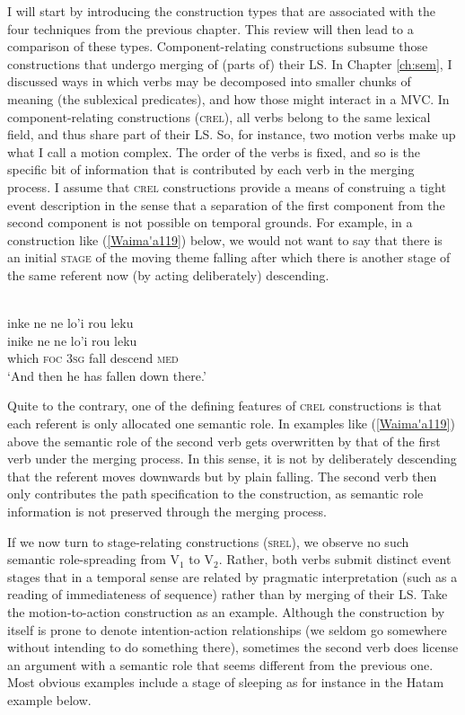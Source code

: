 I will start by introducing the construction types that are associated with the four techniques from the previous chapter. This review will then lead to a comparison of these types. Component-relating constructions subsume those constructions that undergo merging of (parts of) their LS. In Chapter \ref{ch:sem}, I  discussed ways in which verbs may be decomposed into smaller chunks of meaning (the sublexical predicates), and how those might interact in a MVC. In component-relating constructions (\textsc{crel}), all verbs belong to the same lexical field, and thus share part of their LS. So, for instance, two motion verbs make up what I call a motion complex. The order of the verbs is fixed, and so is the specific bit of information that is contributed by each verb in the merging process. I assume that \textsc{crel} constructions provide a means of construing a tight event description in the sense that a separation of the first component from the second component is not possible on temporal grounds. For example, in a construction like (\ref{Waima'a119}) below, we would not want to say that there is an initial \textsc{stage} of the moving theme falling after which there is another stage of the same referent now (by acting deliberately) descending. 

\ea \label{Waima'a119}
\\
\glll inke ne ne lo'i rou leku \\
inike ne ne lo'i rou leku \\
which \textsc{foc} \textsc{3}\textsc{sg} fall descend \textsc{med} \\
\glft `And then he has fallen down there.' \\ 
\z

Quite to the contrary, one of the defining features of \textsc{crel} constructions is that each referent is only allocated one semantic role. In examples like (\ref{Waima'a119}) above the semantic role of the second verb gets overwritten by that of the first verb under the merging process. In this sense, it is not by deliberately descending that the referent moves downwards but by plain falling. The second verb then only contributes the path specification to the construction, as semantic role information is not preserved through the merging process.
 
If we now turn to stage-relating constructions (\textsc{srel}), we observe no such semantic role-spreading from V$_1$ to V$_2$. Rather, both verbs submit distinct event stages that in a temporal sense are related by pragmatic interpretation (such as a reading of immediateness of sequence) rather than by merging of their LS. Take the motion-to-action construction as an example. Although the construction by itself is prone to denote intention-action relationships (we seldom go somewhere without intending to do something there), sometimes the second verb does license an argument with a semantic role that seems different from the previous one. Most obvious examples include a stage of sleeping as for instance in the Hatam example below.

